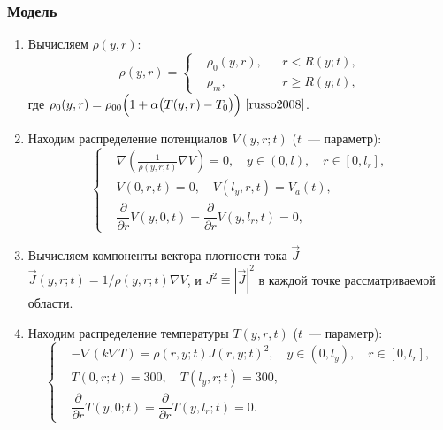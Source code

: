 \documentclass{beamer}
\begin{document}
\begin{frame}[allowframebreaks]
    \frametitle{Модель}
    \begin{enumerate}
        \item Вычисляем $\rho(y,r)$:
        \begin{equation*}
            \rho(y,r) =
            \left\{
            \begin{aligned}
                &\rho_0(y,r), &  &r < R(y;t),\\
                &\rho_m, & &r \geqslant R(y;t),
            \end{aligned}
            \right.
        \end{equation*}
        где $ \rho_0(y,r)=\rho_{00}\Big(1 + \alpha \big(T(y,r) - T_0\big) \Big)~\cite{russo2008}$.

    \item Находим распределение потенциалов $V(y,r;t)$ ($t$~--- параметр):
        \begin{equation*}
            \left\{
            \begin{aligned}
                &\nabla \left(\frac{1}{\rho(y,r;t)}\nabla V\right) = 0, \quad y \in (0,l), \quad r \in [0,l_r],\\
                &V(0,r,t) = 0, \quad V(l_y,r,t) = V_a(t),\\
                &\dfrac{\partial}{\partial r}V(y,0,t) = \dfrac{\partial}{\partial r} V(y,l_r,t)=0,
            \end{aligned}
            \right.
        \end{equation*}

    \item Вычисляем компоненты вектора плотности тока $\vec{J}$ $\vec{J}(y,r;t) =1/\rho(y,r; t) \nabla V$, и $J^2 \equiv |\vec{J}|^2$ в каждой точке рассматриваемой области.

    \item Находим распределение температуры $T(y,r,t)$ ($t$~--- параметр):
        \begin{equation*}
            \left\{
            \begin{aligned}
                &-\nabla (k\nabla T)= \rho(r,y; t) J(r,y;t)^2, \quad y \in (0,l_y), \quad r \in [0,l_r],\\
                &T(0,r;t) = 300, \quad T(l_y,r;t) = 300,\\
                &\dfrac{\partial}{\partial r}T(y,0;t) = \dfrac{\partial}{\partial r} T(y,l_r;t)=0.
            \end{aligned}
            \right.
        \end{equation*}


\end{enumerate}
\end{frame}
\end{document}
